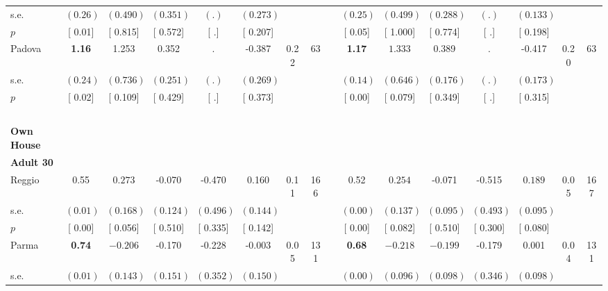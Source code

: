 \begin{longtable}{L{8em} c c c c c c c p{1em} c c c c c c c}
\quad \quad \quad \quad s.e.& $ (     0.26)$ & $ (    0.490)$ & $ (    0.351)$ & $ (        .)$ & $ (    0.273)$ & & & & $ (     0.25)$ & $ (    0.499)$ & $ (    0.288)$ & $ (        .)$ & $ (    0.133)$ & &  \\*
\quad \quad \quad \quad $ p$ & [     0.01] & [    0.815] & [    0.572] & [        .] & [    0.207] & & & & [     0.05] & [    1.000] & [    0.774] & [        .] & [    0.198] & &  \\[1em]
\quad \quad \quad Padova& \textbf{     1.16} &     1.253 &     0.352 &         . &    -0.387 &      0.22 &        63 & & \textbf{     1.17} & $ \mathbf{    1.333}$ &     0.389 &         . &    -0.417 &      0.20 &        63  \\*
\quad \quad \quad \quad s.e.& $ (     0.24)$ & $ (    0.736)$ & $ (    0.251)$ & $ (        .)$ & $ (    0.269)$ & & & & $ (     0.14)$ & $ (    0.646)$ & $ (    0.176)$ & $ (        .)$ & $ (    0.173)$ & &  \\*
\quad \quad \quad \quad $ p$ & [     0.02] & [    0.109] & [    0.429] & [        .] & [    0.373] & & & & [     0.00] & [    0.079] & [    0.349] & [        .] & [    0.315] & &  \\[1em]
~\\[1em]
\textbf{Own House} \\*
\quad \quad \textbf{Adult 30} & & & & & & & & & & & & & & & \\* 
\quad \quad \quad Reggio& 0.55 & $ \mathbf{    0.273}$ &    -0.070 &    -0.470 &     0.160 &      0.11 &       166 & & 0.52 & $ \mathbf{    0.254}$ &    -0.071 &    -0.515 & $ \mathbf{    0.189}$ &      0.05 &       167  \\*
\quad \quad \quad \quad s.e.& $ (     0.01)$ & $ (    0.168)$ & $ (    0.124)$ & $ (    0.496)$ & $ (    0.144)$ & & & & $ (     0.00)$ & $ (    0.137)$ & $ (    0.095)$ & $ (    0.493)$ & $ (    0.095)$ & &  \\*
\quad \quad \quad \quad $ p$ & [     0.00] & [    0.056] & [    0.510] & [    0.335] & [    0.142] & & & & [     0.00] & [    0.082] & [    0.510] & [    0.300] & [    0.080] & &  \\[1em]
\quad \quad \quad Parma& \textbf{     0.74} & $ \mathbf{   -0.206}$ &    -0.170 &    -0.228 &    -0.003 &      0.05 &       131 & & \textbf{     0.68} & $ \mathbf{   -0.218}$ & $ \mathbf{   -0.199}$ &    -0.179 &     0.001 &      0.04 &       131  \\*
\quad \quad \quad \quad s.e.& $ (     0.01)$ & $ (    0.143)$ & $ (    0.151)$ & $ (    0.352)$ & $ (    0.150)$ & & & & $ (     0.00)$ & $ (    0.096)$ & $ (    0.098)$ & $ (    0.346)$ & $ (    0.098)$ & &  \\*

\end{longtable}
